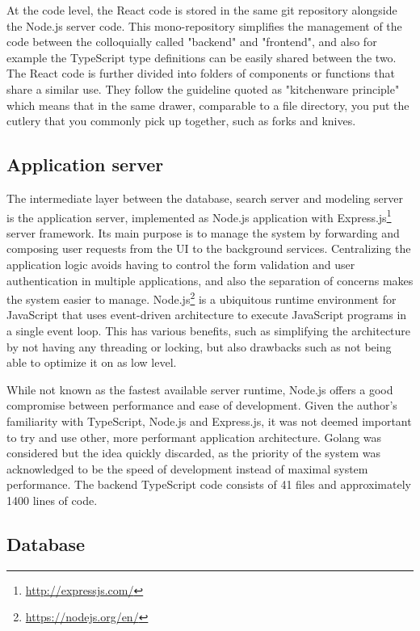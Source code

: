 At the code level, the React code is stored in the same git repository alongside the Node.js server code. This mono-repository simplifies the management of the code between the colloquially called "backend" and "frontend", and also for example the TypeScript type definitions can be easily shared between the two. The React code is further divided into folders of components or functions that share a similar use. They follow the guideline quoted as "kitchenware principle" which means that in the same drawer, comparable to a file directory, you put the cutlery that you commonly pick up together, such as forks and knives.

\subsection{Application server}

The intermediate layer between the database, search server and modeling server is the application server, implemented as Node.js application with Express.js\footnote{\url{http://expressjs.com/}} server framework. Its main purpose is to manage the system by forwarding and composing user requests from the UI to the background services. Centralizing the application logic avoids having to control the form validation and user authentication in multiple applications, and also the separation of concerns makes the system easier to manage. Node.js\footnote{\url{https://nodejs.org/en/}} is a ubiquitous runtime environment for JavaScript that uses event-driven architecture to execute JavaScript programs in a single event loop. This has various benefits, such as simplifying the architecture by not having any threading or locking, but also drawbacks such as not being able to optimize it on as low level.

While not known as the fastest available server runtime, Node.js offers a good compromise between performance and ease of development. Given the author's familiarity with TypeScript, Node.js and Express.js, it was not deemed important to try and use other, more performant application architecture. Golang was considered but the idea quickly discarded, as the priority of the system was acknowledged to be the speed of development instead of maximal system performance. The backend TypeScript code consists of 41 files and approximately 1400 lines of code.

\subsection{Database}

